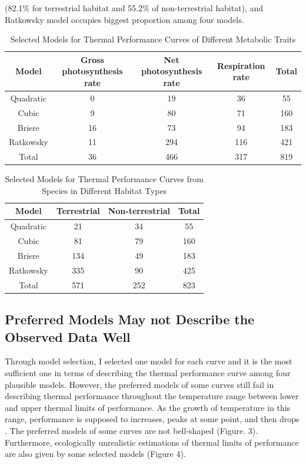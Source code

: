 \documentclass[11pt]{article}
\begin{document}
        (82.1\% for terrestrial habitat and 55.2\% of non-terrestrial habitat), and Ratkowsky model occupies biggest proportion 
        among four models. 
        \begin{table}[H]
          \centering
          \caption{Selected Models for Thermal Performance Curves of Different Metabolic Traits}
          \begin{tabular}{@{}ccccc@{}}
          \toprule
          Model     & Gross photosynthesis rate & Net photosynthesis rate & Respiration rate  & Total \\ \midrule
          Quadratic & 0   & 19  & 36  & 55    \\
          Cubic     & 9   & 80  & 71  & 160   \\
          Briere    & 16  & 73  & 94  & 183   \\
          Ratkowsky & 11  & 294 & 116 & 421   \\
          Total     & 36  & 466 & 317 & 819   \\ \bottomrule
          \end{tabular}
          \end{table}
      
      
          \begin{table}[H]
            \centering
            \caption{Selected Models for Thermal Performance Curves from Species in Different Habitat Types}
            \begin{tabular}{@{}cccc@{}}
            \toprule
            Model     & Terrestrial & Non-terrestrial & Total \\ \midrule
            Quadratic & 21          & 34              & 55    \\
            Cubic     & 81          & 79              & 160   \\
            Briere    & 134         & 49              & 183   \\
            Ratkowsky & 335         & 90              & 425   \\
            Total     & 571         & 252             & 823   \\ \bottomrule
            \end{tabular}
            \end{table}


    \subsection{Preferred Models May not Describe the Observed Data Well}
    Through model selection, I selected one model for each curve and it is the most sufficient one in terms of describing 
    the thermal performance curve among four plausible models. However, the preferred models of some curves still 
    fail in describing thermal performance throughout the temperature 
    range between lower and upper thermal limits of performance. As the growth of temperature in this range, 
    performance is supposed to increases, peaks at some point, and then drops \cite{sinclair2016can,krenek2011thermal}. 
    The preferred models of some curves are 
    not bell-shaped (Figure. 3). Furthermore, ecologically unrealistic estimations 
    of thermal limits of performance are also given by some selected models (Figure 4). 
     
\end{document}
